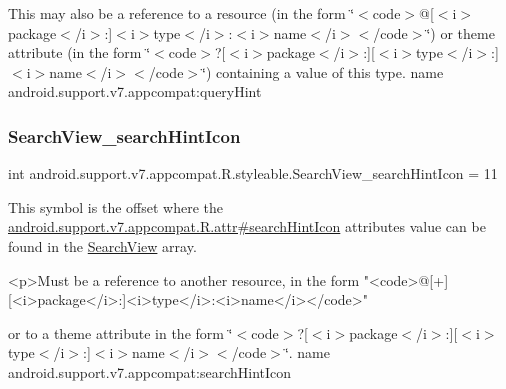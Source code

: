 This may also be a reference to a resource (in the form \char`\"{}$<$code$>$@\mbox{[}$<$i$>$package$<$/i$>$\+:\mbox{]}$<$i$>$type$<$/i$>$\+:$<$i$>$name$<$/i$>$$<$/code$>$\char`\"{}) or theme attribute (in the form \char`\"{}$<$code$>$?\mbox{[}$<$i$>$package$<$/i$>$\+:\mbox{]}\mbox{[}$<$i$>$type$<$/i$>$\+:\mbox{]}$<$i$>$name$<$/i$>$$<$/code$>$\char`\"{}) containing a value of this type.  name android.\+support.\+v7.\+appcompat\+:query\+Hint \mbox{\label{classandroid_1_1support_1_1v7_1_1appcompat_1_1R_1_1styleable_a2794d77a4ddac9ee228c28d219ff6b31}} 
\subsubsection{\texorpdfstring{Search\+View\+\_\+search\+Hint\+Icon}{SearchView\_searchHintIcon}}
{\footnotesize\ttfamily int android.\+support.\+v7.\+appcompat.\+R.\+styleable.\+Search\+View\+\_\+search\+Hint\+Icon = 11\hspace{0.3cm}{\ttfamily [static]}}

This symbol is the offset where the \hyperlink{classandroid_1_1support_1_1v7_1_1appcompat_1_1R_1_1attr_a408b8a2fc893dd24796a5646f93c512e}{android.\+support.\+v7.\+appcompat.\+R.\+attr\#search\+Hint\+Icon} attribute\textquotesingle{}s value can be found in the \hyperlink{classandroid_1_1support_1_1v7_1_1appcompat_1_1R_1_1styleable_a01af09df9e38f1e4f57165c3d3cee9fe}{Search\+View} array.

\begin{DoxyVerb}      <p>Must be a reference to another resource, in the form "<code>@[+][<i>package</i>:]<i>type</i>:<i>name</i></code>"
\end{DoxyVerb}
 or to a theme attribute in the form \char`\"{}$<$code$>$?\mbox{[}$<$i$>$package$<$/i$>$\+:\mbox{]}\mbox{[}$<$i$>$type$<$/i$>$\+:\mbox{]}$<$i$>$name$<$/i$>$$<$/code$>$\char`\"{}.  name android.\+support.\+v7.\+appcompat\+:search\+Hint\+Icon \mbox{\label{classandroid_1_1support_1_1v7_1_1appcompat_1_1R_1_1styleable_a8e6e122f919effcc0243ea3cc6d47524}} 
